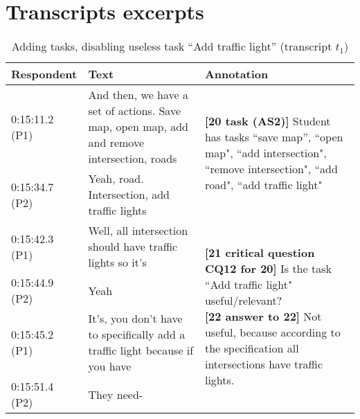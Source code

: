 \section{Transcripts excerpts}
\label{sect:transcripts:excerpts}

\begin{table}[!htbp]
\centering
\begin{tabular}{|p{20mm}|p{70mm}|p{60mm}|}
\hline
\textbf{Respondent} & \textbf{Text} & \textbf{Annotation}\\
\hline
0:15:11.2 (P1) & And then, we have a set of actions. Save map, open map, add and remove intersection, roads & \multirow{2}{60mm}{\textbf{[20 task (AS2)]} Student has tasks ``save map'', ``open map", ``add intersection", ``remove intersection", ``add road", ``add traffic light"}\\
\cline{1-2}
0:15:34.7 (P2) & Yeah, road. Intersection, add traffic lights &\\
\hline
0:15:42.3 (P1) & Well, all intersection should have traffic lights so it's & \multirow{4}{60mm}{\textbf{[21 critical question CQ12 for 20]} Is the task ``Add traffic light" useful/relevant?\newline
\textbf{[22 answer to 22]} Not useful, because according to the specification all intersections have traffic lights.}\\
\cline{1-2}
0:15:44.9 (P2) & Yeah &\\
\cline{1-2}
0:15:45.2 (P1) & It's, you don't have to specifically add a traffic light because if you have &\\
\cline{1-2}
0:15:51.4 (P2)	& They need-&\\
\hline
\end{tabular}
\caption{Adding tasks, disabling useless task ``Add traffic light'' (transcript $t_1$)}
\label{table:transcripts:traffic-light}


\end{table}
